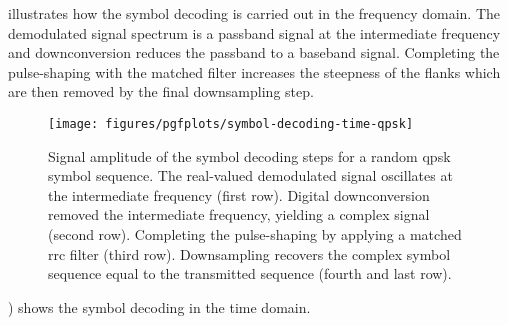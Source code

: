  illustrates how the symbol decoding is carried out in the frequency domain.
The demodulated signal spectrum is a passband signal at the intermediate frequency and downconversion reduces the passband to a baseband signal.
Completing the pulse-shaping with the matched filter increases the steepness of the flanks which are then removed by the final downsampling step.
\begin{figure}[htb]
	\centering
	\texttt{[image: figures/pgfplots/symbol-decoding-time-qpsk]}
	\caption{Signal amplitude of the symbol decoding steps for a random \gls{qpsk} symbol sequence. The real-valued demodulated signal oscillates at the intermediate frequency (first row). Digital downconversion removed the intermediate frequency, yielding a complex signal (second row). Completing the pulse-shaping by applying a matched \gls{rrc} filter (third row). Downsampling recovers the complex symbol sequence equal to the transmitted sequence (fourth and last row).}\label{fig:symbol_decoding_time}
\end{figure}
) shows the symbol decoding in the time domain.